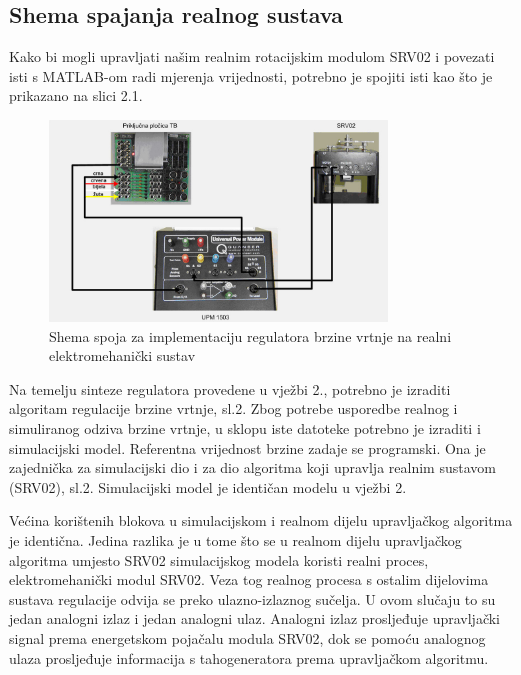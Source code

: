 \documentclass[12pt,a4paper]{article}
\begin{document}
\subsection{Shema spajanja realnog sustava}

Kako bi mogli upravljati našim realnim rotacijskim modulom SRV02 i povezati isti s MATLAB-om radi mjerenja vrijednosti, potrebno je spojiti isti kao što je prikazano na slici 2.1.

\begin{figure}[h]
	\begin{center}
	\includegraphics[width=0.8\textwidth] {konekcije.png}
    \caption{Shema spoja za implementaciju regulatora brzine vrtnje na realni elektromehanički sustav}
    \end{center}
\end{figure}

Na temelju sinteze regulatora provedene u vježbi 2., potrebno je izraditi algoritam regulacije brzine vrtnje, sl.2. Zbog potrebe usporedbe realnog i simuliranog odziva brzine vrtnje, u sklopu iste datoteke potrebno je izraditi i simulacijski model. Referentna vrijednost brzine zadaje se programski. Ona je zajednička za simulacijski dio i za dio algoritma koji upravlja realnim sustavom (SRV02), sl.2. Simulacijski model je identičan modelu u vježbi 2. 

Većina korištenih blokova u simulacijskom i realnom dijelu upravljačkog algoritma je identična. Jedina razlika je u tome što se u realnom dijelu upravljačkog algoritma umjesto SRV02 simulacijskog modela koristi realni proces, elektromehanički modul SRV02. Veza tog
realnog procesa s ostalim dijelovima sustava regulacije odvija se preko ulazno-izlaznog sučelja. U ovom slučaju to su jedan analogni izlaz i jedan analogni ulaz. Analogni izlaz prosljeđuje
upravljački signal prema energetskom pojačalu modula SRV02, dok se pomoću analognog ulaza prosljeđuje informacija s tahogeneratora prema upravljačkom algoritmu.
\end{document}
